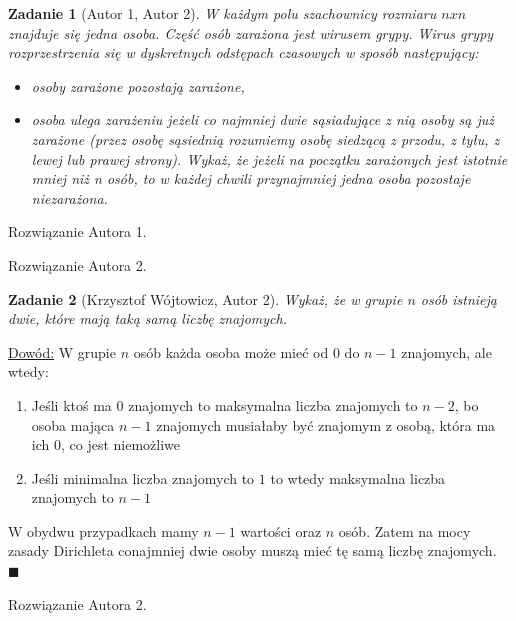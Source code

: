 \documentclass{mwart}
\newtheorem{zad}{Zadanie}[section]
\begin{document}
\begin{zad}[Autor 1, Autor 2]
    W każdym polu szachownicy rozmiaru $n x n $ znajduje się jedna osoba.
    Część osób zarażona jest wirusem grypy. Wirus grypy rozprzestrzenia się w dyskretnych
    odstępach czasowych w sposób następujący:
    \begin{itemize}
        \item osoby zarażone pozostają zarażone,
        \item osoba ulega zarażeniu jeżeli co najmniej dwie sąsiadujące z nią osoby są już zarażone
              (przez osobę sąsiednią rozumiemy osobę siedzącą z przodu, z tyłu, z lewej lub prawej
              strony).
              Wykaż, że jeżeli na początku zarażonych jest istotnie mniej niż n osób, to w każdej chwili
              przynajmniej jedna osoba pozostaje niezarażona.
    \end{itemize}
\end{zad}
\begin{mdframed}
    Rozwiązanie Autora 1.
\end{mdframed}
\begin{mdframed}
    Rozwiązanie Autora 2.
\end{mdframed}




\begin{zad}[Krzysztof Wójtowicz, Autor 2]
    Wykaż, że w grupie $n$ osób istnieją dwie, które mają taką samą liczbę znajomych.
\end{zad}
\begin{mdframed}
    \underline{Dowód:}
    \newline
    W grupie $n$ osób każda osoba może mieć od $0$ do $n-1$ znajomych, ale wtedy:
    \begin{enumerate}
        \item Jeśli ktoś ma $0$ znajomych to maksymalna liczba znajomych to $n-2$, bo osoba mająca $n-1$ znajomych
              musiałaby być znajomym z osobą, która ma ich $0$, co jest niemożliwe
        \item Jeśli minimalna liczba znajomych to $1$ to wtedy maksymalna liczba znajomych to $n-1$
    \end{enumerate}
    W obydwu przypadkach mamy $n-1$ wartości oraz $n$ osób. Zatem na mocy zasady Dirichleta conajmniej dwie
    osoby muszą mieć tę samą liczbę znajomych.
    $\blacksquare$
\end{mdframed}
\begin{mdframed}
    Rozwiązanie Autora 2.
\end{mdframed}
\end{document}

